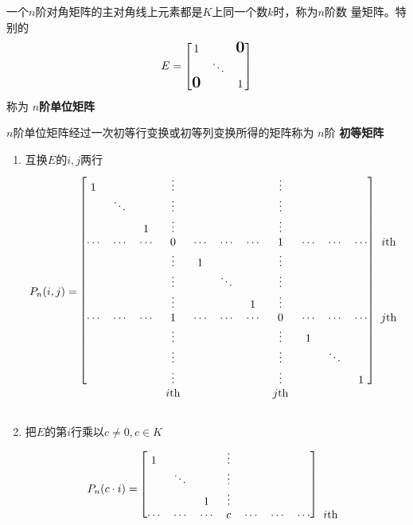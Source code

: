 \documentclass[11pt]{article}
\begin{document}
一个\(n\)阶对角矩阵的主对角线上元素都是\(K\)上同一个数\(k\)时，称为\(n\)阶数
量矩阵。特别的
\begin{equation*}
E=
\begin{bmatrix}
1&&\mbox{\normalfont\Large\bfseries 0}\\
&\ddots&\\
\mbox{\normalfont\Large\bfseries 0}&&1
\end{bmatrix}
\end{equation*}
称为 \textbf{\(n\)阶单位矩阵}

\begin{definition}[]
\(n\)阶单位矩阵经过一次初等行变换或初等列变换所得的矩阵称为 \(n\)阶
\textbf{初等矩阵}
\begin{enumerate}
\item 互换\(E\)的\(i,j\)两行
\begin{equation*}
P_n(i,j)=
\begin{blockarray}{cccccccccccc}
\begin{block}{[ccccccccccc]c}
1&&&\vdots&&&&\vdots&&&&\\
&\ddots&&\vdots&&&&\vdots&&&&\\
&&1&\vdots&&&&\vdots&&&&\\
\cdots&\cdots&\cdots&0&\cdots&\cdots&\cdots&1
&\cdots&\cdots&\cdots&i\text{th}\\
&&&\vdots&1&&&\vdots&&&&\\
&&&\vdots&&\ddots&&\vdots&&&&\\
&&&\vdots&&&1&\vdots&&&&\\
\cdots&\cdots&\cdots&1&\cdots&\cdots&\cdots&0
&\cdots&\cdots&\cdots&j\text{th}\\
&&&\vdots&&&&\vdots&1&&&\\
&&&\vdots&&&&\vdots&&\ddots&&\\
&&&\vdots&&&&\vdots&&&1&\\
\end{block}
&&&i\text{th}&&&&j\text{th}&&&&\\
\end{blockarray}
\end{equation*}
\item 把\(E\)的第\(i\)行乘以\(c\neq0,c\in K\)
\begin{equation*}
P_n(c\cdot i)=
\begin{blockarray}{cccccccc}
\begin{block}{[ccccccc]c}
1&&&\vdots\\
&\ddots&&\vdots\\
&&1&\vdots\\
\cdots&\cdots&\cdots&c&\cdots&\cdots&\cdots&i\text{th}\\

\end{block}
\end{blockarray}
\end{equation*}
\end{enumerate}
\end{definition}
\end{document}
